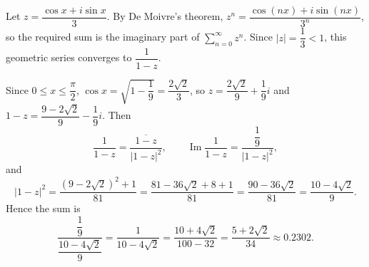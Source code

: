 Let $z=\dfrac{\cos x+i\sin x}{3}$. By De Moivre's theorem, $z^n=\dfrac{\cos(nx)+i\sin(nx)}{3^n}$, so the required sum is the imaginary part of $\displaystyle\sum_{n=0}^{\infty}z^n$. Since $|z|=\dfrac13<1$, this geometric series converges to $\dfrac{1}{1-z}$.

Since $0\le x\le\dfrac\pi2$, $\cos x=\sqrt{1-\dfrac19}=\dfrac{2\sqrt2}{3}$, so $z=\dfrac{2\sqrt2}{9}+\dfrac{1}{9}i$ and $1-z=\dfrac{9-2\sqrt2}{9}-\dfrac19i$. Then
\[\dfrac{1}{1-z}=\dfrac{\overline{1-z}}{|1-z|^2},\qquad\operatorname{Im}\dfrac1{1-z}=\dfrac{\dfrac19}{|1-z|^2},\]
and
\[|1-z|^2=\dfrac{(9-2\sqrt2)^2+1}{81}=\dfrac{81-36\sqrt2+8+1}{81}=\dfrac{90-36\sqrt2}{81}=\dfrac{10-4\sqrt2}{9}.\]
Hence the sum is
\[\dfrac{\dfrac19}{\dfrac{10-4\sqrt2}{9}}=\dfrac{1}{10-4\sqrt2}=\dfrac{10+4\sqrt2}{100-32}=\boxed{\dfrac{5+2\sqrt2}{34}}\approx0.2302.\]
